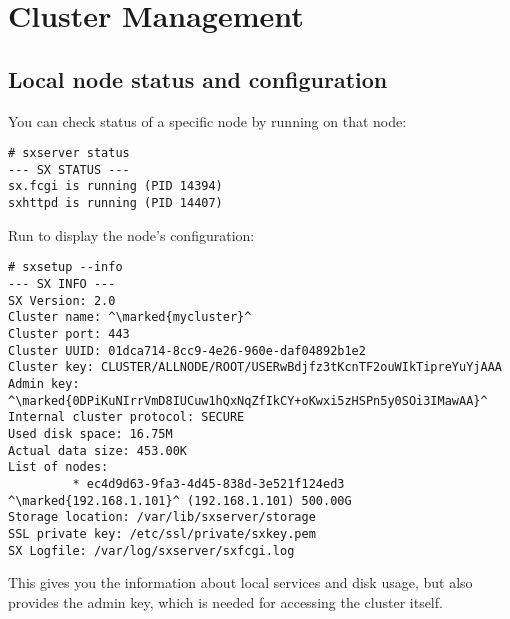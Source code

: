 \chapter{Cluster Management}

\section{Local node status and configuration}
You can check status of a specific node by running  on
that node:
\begin{lstlisting}
# sxserver status
--- SX STATUS ---
sx.fcgi is running (PID 14394)
sxhttpd is running (PID 14407)
\end{lstlisting}
Run  to display the node's configuration:
\begin{lstlisting}
# sxsetup --info
--- SX INFO ---
SX Version: 2.0
Cluster name: ^\marked{mycluster}^
Cluster port: 443
Cluster UUID: 01dca714-8cc9-4e26-960e-daf04892b1e2
Cluster key: CLUSTER/ALLNODE/ROOT/USERwBdjfz3tKcnTF2ouWIkTipreYuYjAAA
Admin key: ^\marked{0DPiKuNIrrVmD8IUCuw1hQxNqZfIkCY+oKwxi5zHSPn5y0SOi3IMawAA}^
Internal cluster protocol: SECURE
Used disk space: 16.75M
Actual data size: 453.00K
List of nodes:
         * ec4d9d63-9fa3-4d45-838d-3e521f124ed3 ^\marked{192.168.1.101}^ (192.168.1.101) 500.00G
Storage location: /var/lib/sxserver/storage
SSL private key: /etc/ssl/private/sxkey.pem
SX Logfile: /var/log/sxserver/sxfcgi.log
\end{lstlisting}
This gives you the information about local services and disk usage, but
also provides the admin key, which is needed for accessing the cluster
itself.

